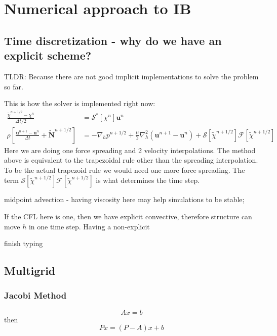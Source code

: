 \documentclass[12pt,a4paper,twoside]{article}
\begin{document}
\section{Numerical approach to IB}
\subsection{Time discretization - why do we have an explicit scheme?}
TLDR: Because there are not good implicit implementations to solve the problem so far. 

This is how the solver is implemented right now:
\begin{equation*}
\begin{split}
    \frac{\tilde{\chi}^{n+1/2} - \chi^{n}}{\Delta t /2 } &= \mathcal{S}^*[\chi^n] \bm{u}^n\\
    \rho \left[ \frac{\bm{u}^{n+1} - \bm{u}^{n}}{\Delta t} + \tilde{\bm{N}}^{n+1/2}\right] &= -\nabla_h p^{n+1/2} + \frac{\mu}{2} \nabla_h^2(\bm{u}^{n+1} - \bm{u}^{n}) + \mathcal{S}[\tilde{\chi}^{n+1/2}]\mathcal{F}[\tilde{\chi}^{n+1/2}]
\end{split}
\end{equation*}
Here we are doing one force spreading and 2 velocity interpolations. 
The method above is equivalent to the trapezoidal rule other than the spreading interpolation. To be the actual trapezoid rule we would need one more force spreading.
The term $\mathcal{S}[\tilde{\chi}^{n+1/2}]\mathcal{F}[\tilde{\chi}^{n+1/2}]$ is what determines the time step. 


midpoint advection - having viscosity here may help simulations to be stable;

If the CFL here is one, then we have explicit convective, therefore structure can move $h$ in one time step. 
Having a non-explicit 


{\color{red} finish typing}

\subsection{Multigrid}

\subsubsection{Jacobi Method}
\begin{equation}
    Ax=b
\end{equation}
then 
\begin{equation}
    Px = (P-A)x+b
\end{equation}
\end{document}
